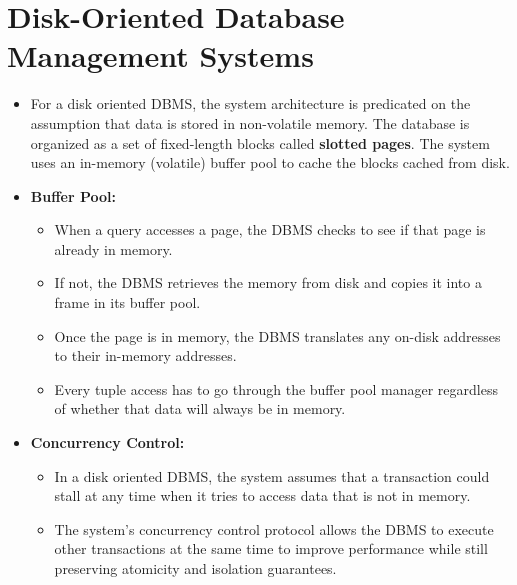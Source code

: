 \documentclass[11pt]{article}
\begin{document}
\section{Disk-Oriented Database Management Systems}
\begin{itemize}
    \item
    For a disk oriented DBMS, the system architecture is predicated on the assumption that data 
    is stored in non-volatile memory.
    The database is organized as a set of fixed-length blocks called \textbf{slotted pages}.
    The system uses an in-memory (volatile) buffer pool to cache the blocks cached from disk.
    
    \item \textbf{Buffer Pool:}
    \begin{itemize}
        \item
        When a query accesses a page, the DBMS checks to see if that page is already in memory.
        
        \item
        If not, the DBMS retrieves the memory from disk and copies it into a frame in its 
        buffer pool.
        
        \item
        Once the page is in memory, the DBMS translates any on-disk addresses to their 
        in-memory addresses.
        
        \item
        Every tuple access has to go through the buffer pool manager regardless of whether 
        that data will always be in memory.
    \end{itemize}
    
    \item \textbf{Concurrency Control:}
    \begin{itemize}
        \item
        In a disk oriented DBMS, the system assumes that a transaction could stall at any time when 
        it tries to access data that is not in memory.
        
        \item
        The system's concurrency control protocol allows the DBMS to execute other transactions at 
        the same time to improve performance while still preserving atomicity and isolation 
        guarantees.
        

\end{itemize}
\end{itemize}
\end{document}
